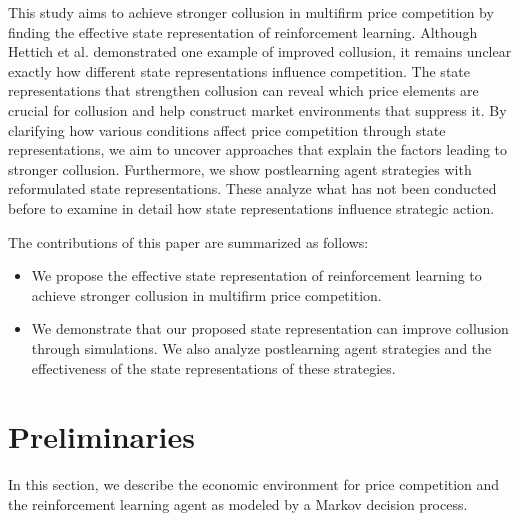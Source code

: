 \documentclass[runningheads]{llncs}
\begin{document}
This study aims to achieve stronger collusion in multifirm price competition by finding the effective state representation of reinforcement learning. Although Hettich et al. \cite{hettich2021} demonstrated one example of improved collusion, it remains unclear exactly how different state representations influence competition. The state representations that strengthen collusion can reveal which price elements are crucial for collusion and help construct market environments that suppress it. By clarifying how various conditions affect price competition through state representations, we aim to uncover approaches that explain the factors leading to stronger collusion. Furthermore, we show postlearning agent strategies with reformulated state representations. These analyze what has not been conducted before to examine in detail how state representations influence strategic action.

The contributions of this paper are summarized as follows:
\begin{itemize}
\item We propose the effective state representation of reinforcement learning to achieve stronger collusion in multifirm price competition.
\item We demonstrate that our proposed state representation can improve collusion through simulations. We also analyze postlearning agent strategies and the effectiveness of the state representations of these strategies.
\end{itemize}


\section{Preliminaries}\label{sec:preliminaries}
In this section, we describe the economic environment for price competition and the reinforcement learning agent as modeled by a Markov decision process.
\end{document}
